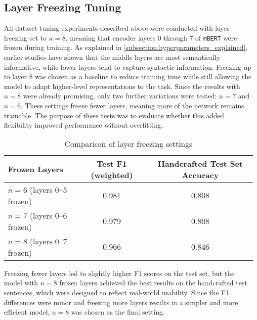 \subsection{Layer Freezing Tuning}
    All dataset tuning experiments described above were conducted with layer freezing set to $n=8$, meaning that encoder layers 0 through 7 of \texttt{mBERT} were frozen during training. As explained in \autoref{subsection:hyperparameters_explained}, earlier studies have shown that the middle layers are most semantically informative, while lower layers tend to capture syntactic information. Freezing up to layer 8 was chosen as a baseline to reduce training time while still allowing the model to adapt higher-level representations to the task. Since the results with $n=8$ were already promising, only two further variations were tested: $n=7$ and $n=6$. These settings freeze fewer layers, meaning more of the network remains trainable. The purpose of these tests was to evaluate whether this added flexibility improved performance without overfitting.

    \vspace{0.8em}
    \begin{table}[ht]
        \centering
        \begin{tabularx}{\linewidth}{Xcc}
        \toprule
        \textbf{Frozen Layers} & \textbf{Test F1 (weighted)} & \textbf{Handcrafted Test Set Accuracy} \\
        \midrule
        $n=6$ (layers 0--5 frozen) & 0.981 & 0.808 \\
        $n=7$ (layers 0--6 frozen) & 0.979 & 0.808 \\
        $n=8$ (layers 0--7 frozen) & 0.966 & 0.846 \\
        \bottomrule
        \end{tabularx}
        \caption{Comparison of layer freezing settings}
    \end{table}

    Freezing fewer layers led to slightly higher F1 scores on the test set, but the model with $n=8$ frozen layers achieved the best results on the handcrafted test sentences, which were designed to reflect real-world usability. Since the F1 differences were minor and freezing more layers results in a simpler and more efficient model, $n=8$ was chosen as the final setting.

